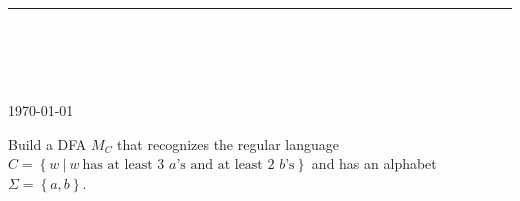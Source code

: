 



\thispagestyle{empty}

\begin{center}
\textsc{\theinstitution}\\[2mm]

\thedepartment

\rule{0.6\textwidth}{0.5pt}\\[2mm]

\thecourse \\[4mm]

{\Large \textbf{\thetitle}}\\[2mm]

\theauthor \\[2mm]

{\small \today}
\end{center}
\medskip


Build a DFA $M_C$ that recognizes the regular language $C = \left\{w\ |\ w\ \text{has at least 3 $a$'s and at least 2 $b$'s} \right\}$ and has an alphabet $\Sigma = \left\{a, b\right\}$.

